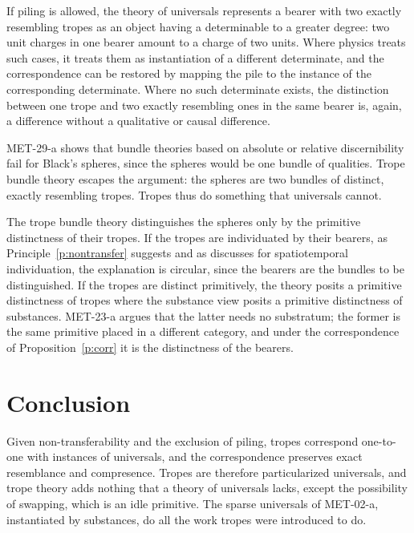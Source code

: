 \documentclass{situationist-preprint}
\begin{document}
\begin{reply}
If piling is allowed, the theory of universals represents a bearer with two exactly resembling tropes as an object having a determinable to a greater degree: two unit charges in one bearer amount to a charge of two units. Where physics treats such cases, it treats them as instantiation of a different determinate, and the correspondence can be restored by mapping the pile to the instance of the corresponding determinate. Where no such determinate exists, the distinction between one trope and two exactly resembling ones in the same bearer is, again, a difference without a qualitative or causal difference.
\end{reply}

\begin{objection}\label{o:bundle}
MET-29-a shows that bundle theories based on absolute or relative discernibility fail for Black's spheres, since the spheres would be one bundle of qualities. Trope bundle theory escapes the argument: the spheres are two bundles of distinct, exactly resembling tropes. Tropes thus do something that universals cannot.
\end{objection}

\begin{reply}
The trope bundle theory distinguishes the spheres only by the primitive distinctness of their tropes. If the tropes are individuated by their bearers, as Principle~\ref{p:nontransfer} suggests and as \citet{Schaffer2001} discusses for spatiotemporal individuation, the explanation is circular, since the bearers are the bundles to be distinguished. If the tropes are distinct primitively, the theory posits a primitive distinctness of tropes where the substance view posits a primitive distinctness of substances. MET-23-a argues that the latter needs no substratum; the former is the same primitive placed in a different category, and under the correspondence of Proposition~\ref{p:corr} it is the distinctness of the bearers.
\end{reply}

\section{Conclusion}

Given non-transferability and the exclusion of piling, tropes correspond one-to-one with instances of universals, and the correspondence preserves exact resemblance and compresence. Tropes are therefore particularized universals, and trope theory adds nothing that a theory of universals lacks, except the possibility of swapping, which is an idle primitive. The sparse universals of MET-02-a, instantiated by substances, do all the work tropes were introduced to do.
\end{document}
